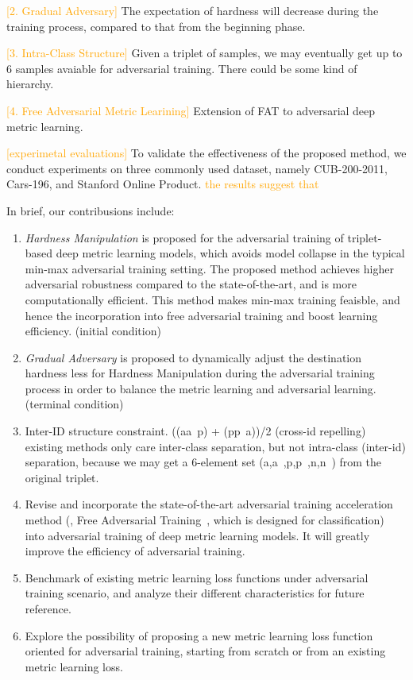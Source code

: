 \documentclass[10pt,twocolumn,letterpaper]{article}
\newcommand{\oo}[1]{\textcolor{orange}{#1}}
\begin{document}
\oo{[2. Gradual Adversary]}
The expectation of hardness will decrease during the training process,
compared to that from the beginning phase.

\oo{[3. Intra-Class Structure]}
Given a triplet of samples, we may eventually get up to 6 samples avaiable
for adversarial training. There could be some kind of hierarchy.

\oo{[4. Free Adversarial Metric Learining]}
Extension of FAT to adversarial deep metric learning.

\oo{[experimetal evaluations]}
To validate the effectiveness of the proposed method, we conduct experiments
on three commonly used dataset, namely CUB-200-2011, Cars-196, and Stanford
Online Product. \oo{the results suggest that}

In brief, our contribusions include:
%
\begin{enumerate}[noitemsep]
	\item {\textit{Hardness Manipulation}} is proposed for the adversarial
		training of triplet-based deep metric learning models, which avoids
		model collapse in the typical min-max adversarial training setting.
		The proposed method achieves higher adversarial robustness compared to
		the state-of-the-art, and is more computationally efficient.
		This method makes min-max training feaisble, and hence the incorporation
		into free adversarial training and boost learning efficiency.
		(initial condition)
	\item \textit{Gradual Adversary} is proposed to dynamically adjust the
		destination hardness less for Hardness Manipulation during the
		adversarial training process in order to balance the metric learning
		and adversarial learning.
		(terminal condition)
	\item Inter-ID structure constraint. ((aa~p) + (pp~a))/2
		(cross-id repelling)
		existing methods only care inter-class separation, but not
		intra-class (inter-id) separation, because we may get a 6-element
		set (a,a~,p,p~,n,n~) from the original triplet.
	\item Revise and incorporate the state-of-the-art adversarial training
		acceleration method (\ie, Free Adversarial Training~\cite{freeat},
		which is designed for classification) into adversarial training of 
		deep metric learning models. It will greatly improve the efficiency
		of adversarial training.
	\item Benchmark of existing metric learning loss functions under
		adversarial training scenario, and analyze their different
		characteristics for future reference.
	\item Explore the possibility of proposing a new metric learning loss
		function oriented for adversarial training, starting from scratch or
		from an existing metric learning loss.
\end{enumerate}
\end{document}
